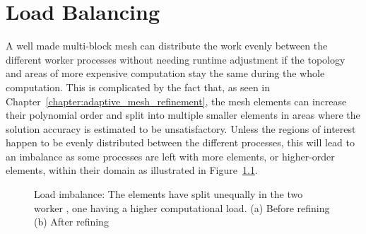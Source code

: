 \chapter{Load Balancing}\label{chapter:load_balancing}

A well made multi-block mesh can distribute the work evenly between the different worker processes
without needing runtime adjustment if the topology and areas of more expensive computation stay the
same during the whole computation. This is complicated by the fact that, as seen in
Chapter~\ref{chapter:adaptive_mesh_refinement}, the mesh elements can increase their polynomial
order and split into multiple smaller elements in areas where the solution accuracy is estimated to
be unsatisfactory. Unless the regions of interest happen to be evenly distributed between the
different processes, this will lead to an imbalance as some processes are left with more elements,
or higher-order elements, within their domain as illustrated in Figure~\ref{fig:load_imbalance_lb}.

\begin{figure}[H]
	\centering
	\hfill
	\caption{Load imbalance: The elements have split unequally in the two worker , one having a higher computational load. (a) Before refining (b) After refining}\label{fig:load_imbalance_lb}
\end{figure}

